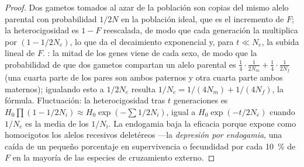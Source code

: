 \begin{proof}
Dos gametos tomados al azar de la población son copias del mismo alelo
parental con probabilidad $1/2N$ en la población ideal, que es el
incremento de $F$; la heterocigosidad es $1 - F$ reescalada, de modo que
cada generación la multiplica por $(1 - 1/2N_{e})$, lo que da el
decaimiento exponencial y, para $t \ll N_{e}$, la subida lineal de $F$.
: la mitad de los genes viene de cada sexo, de modo
que la probabilidad de que dos gametos compartan un alelo parental es
$\tfrac{1}{4}\cdot\tfrac{1}{2N_{m}} +
\tfrac{1}{4}\cdot\tfrac{1}{2N_{f}}$ (una cuarta parte de los pares son
ambos paternos y otra cuarta parte ambos maternos); igualando esto a
$1/2N_{e}$ resulta $1/N_{e} = 1/(4N_{m}) + 1/(4N_{f})$, la fórmula.
Fluctuación: la heterocigosidad tras $t$ generaciones es
$H_{0}\prod(1 - 1/2N_{i})
\approx H_{0}\exp(-\sum 1/2N_{i})$, igual a $H_{0}\exp(-t/2N_{e})$
cuando $1/N_{e}$ es la media de los $1/N_{i}$. La endogamia baja la
eficacia porque expone como homocigotos los alelos recesivos deletéreos
---la \emph{depresión por endogamia}, una caída de un pequeño
porcentaje en supervivencia o fecundidad por cada \qty{10}{\%} de $F$ en
la mayoría de las especies de cruzamiento externo.
\end{proof}

